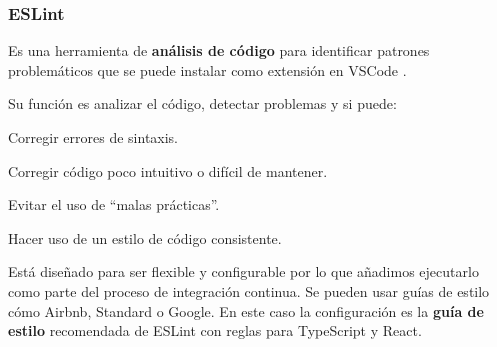 \documentclass[12pt,twoside,titlepage]{report}
\begin{document}
\subsubsection{ESLint}

Es una herramienta de \textbf{análisis de código} para identificar patrones problemáticos que se puede instalar como extensión en VSCode \cite{eslint}.

Su función es analizar el código, detectar problemas y si puede:

\begin{compactitem}
 \item Corregir errores de sintaxis.
 \item Corregir código poco intuitivo o difícil de mantener.
 \item Evitar el uso de ``malas prácticas''.
 \item Hacer uso de un estilo de código consistente.
\end{compactitem}

Está diseñado para ser flexible y configurable por lo que añadimos ejecutarlo como parte del proceso de integración continua. 
Se pueden usar guías de estilo cómo Airbnb, Standard o Google. En este caso la configuración es la \textbf{guía de estilo} recomendada de ESLint con reglas para TypeScript y React. 
\end{document}
